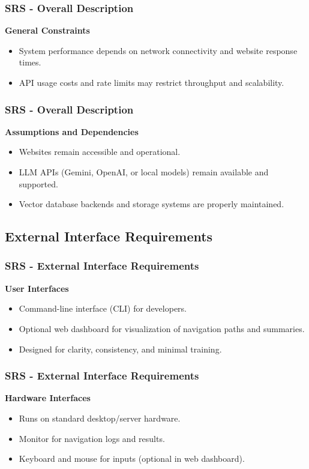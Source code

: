 \documentclass{beamer}
\begin{document}
\begin{frame}
\frametitle{SRS - Overall Description}
\textbf{General Constraints}
\begin{itemize}
    \item System performance depends on network connectivity and website response times.
    \item API usage costs and rate limits may restrict throughput and scalability.
\end{itemize}
\end{frame}

\begin{frame}
\frametitle{SRS - Overall Description}
\textbf{Assumptions and Dependencies}
\begin{itemize}
    \item Websites remain accessible and operational.
    \item LLM APIs (Gemini, OpenAI, or local models) remain available and supported.
    \item Vector database backends and storage systems are properly maintained.
\end{itemize}
\end{frame}

\subsection{External Interface Requirements}
\begin{frame}
\frametitle{SRS - External Interface Requirements}
\textbf{User Interfaces}
\begin{itemize}
    \item Command-line interface (CLI) for developers.
    \item Optional web dashboard for visualization of navigation paths and summaries.
    \item Designed for clarity, consistency, and minimal training.
\end{itemize}
\end{frame}

\begin{frame}
\frametitle{SRS - External Interface Requirements}
\textbf{Hardware Interfaces}
\begin{itemize}
    \item Runs on standard desktop/server hardware.  
    \item Monitor for navigation logs and results.  
    \item Keyboard and mouse for inputs (optional in web dashboard).
\end{itemize}
\end{frame}
\end{document}
